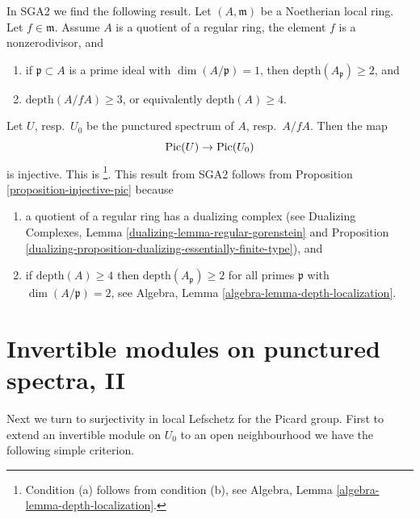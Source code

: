 \begin{remark}
\label{remark-compare-SGA2}
In SGA2 we find the following result. Let $(A, \mathfrak m)$ be a
Noetherian local ring. Let $f \in \mathfrak m$. Assume $A$
is a quotient of a regular ring, the element
$f$ is a nonzerodivisor, and
\begin{enumerate}
\item[(a)] if $\mathfrak p \subset A$ is a prime ideal with
$\dim(A/\mathfrak p) = 1$, then $\text{depth}(A_\mathfrak p) \geq 2$, and
\item[(b)] $\text{depth}(A/fA) \geq 3$, or equivalently
$\text{depth}(A) \geq 4$.
\end{enumerate}
Let $U$, resp.\ $U_0$ be the punctured spectrum of $A$, resp.\ $A/fA$. Then
the map
$$
\mathop{\mathrm{Pic}}\nolimits(U) \to \mathop{\mathrm{Pic}}\nolimits(U_0)
$$
is injective. This is \cite[Exposee XI, Lemma 3.16]{SGA2}\footnote{Condition
(a) follows from condition (b), see
Algebra, Lemma \ref{algebra-lemma-depth-localization}.}. This result
from SGA2 follows from Proposition \ref{proposition-injective-pic}
because
\begin{enumerate}
\item a quotient of a regular ring has a dualizing complex (see
Dualizing Complexes, Lemma \ref{dualizing-lemma-regular-gorenstein} and
Proposition \ref{dualizing-proposition-dualizing-essentially-finite-type}), and
\item if $\text{depth}(A) \geq 4$ then $\text{depth}(A_\mathfrak p) \geq 2$
for all primes $\mathfrak p$ with $\dim(A/\mathfrak p) = 2$, see
Algebra, Lemma \ref{algebra-lemma-depth-localization}.
\end{enumerate}
\end{remark}






\section{Invertible modules on punctured spectra, II}
\label{section-local-lefschetz-for-pic-surjective}

\noindent
Next we turn to surjectivity in local Lefschetz for the Picard group.
First to extend an invertible module on $U_0$ to an open neighbourhood
we have the following simple criterion.

